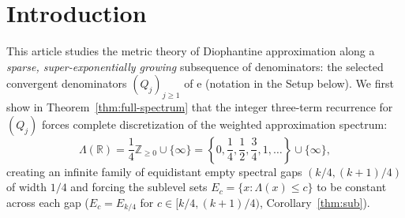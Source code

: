 \documentclass[11pt]{article}
\theoremstyle{definition}
\theoremstyle{remark}
\newcommand{\R}{\mathbb{R}}
\newcommand{\Z}{\mathbb{Z}}
\newcommand{\ee}{\mathrm{e}}
\newcommand{\Lam}{\Lambda}
\begin{document}
\begin{abstract}
(\texttt{ResidueMultiAsymptotic.lean}, $24$ declarations audited in
\texttt{AuditResidueMultiAsymptotic.lean}) and the closed brackets of
Table~\ref{tab:residues-general} (\texttt{ResidueCertTable.lean}, $27$ declarations
audited in \texttt{AuditResidueCert.lean})---are machine-checked in
Lean~4 using only the base axioms \texttt{propext}, \texttt{Classical.choice}
and \texttt{Quot.sound}.
Only the finite-dimensional linear-algebraic Perron--Frobenius eigenvector
existence input in Theorem~\ref{thm:finite-state-tail} and the Python-executed
open-interval strictness verification of the narrow $m\in\{2,3,4,5,6\}$ brackets
via the pressure formalism remain outside the Lean kernel
(Section~\ref{sec:verification}, $937$ main audited declarations across $134$
Lean files in \texttt{Audit.lean} plus standalone audits across $344$ total Lean files).
The classification and the first gap are a subsequence analogue of a criterion
of Kraaikamp and Liardet. The work is a spin-off of a project on the
irrationality of $e+\pi$ and does \emph{not} resolve that open problem.
\end{abstract}

\section{Introduction}

This article studies the metric theory of Diophantine approximation along a
\emph{sparse, super-exponentially growing} subsequence of denominators: the
selected convergent denominators $(Q_j)_{j\ge1}$ of $\ee$ (notation in the
Setup below). We first show in Theorem~\ref{thm:full-spectrum} that the integer
three-term recurrence for $(Q_j)$ forces complete discretization of the weighted
approximation spectrum:
\[
\Lam(\R)=\frac14\Z_{\ge0}\cup\{\infty\}
=\left\{0,\frac14,\frac12,\frac34,1,\dots\right\}\cup\{\infty\},
\]
creating an infinite family of equidistant empty spectral gaps
$(k/4,(k+1)/4)$ of width $1/4$ and forcing the sublevel sets
$E_c=\{x:\Lam(x)\le c\}$ to be constant across each gap
($E_c=E_{k/4}$ for $c\in[k/4,(k+1)/4)$, Corollary~\ref{thm:sub}).
\end{document}
